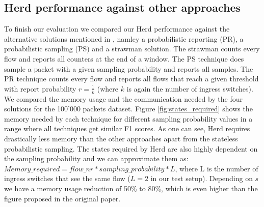 \documentclass[11pt,oneside,a4paper]{article}
\begin{document}
\subsection{Herd performance against other approaches} \label{other_approaches_evaluation}

To finish our evaluation we compared our Herd performance against the alternative solutions mentioned in \cite{anon2019herd}, namley a probabilistic reporting (PR), a probabilistic sampling (PS) and a strawman solution. The strawman counts every flow and reports all counters at the end of a window. The PS technique does sample a packet with a given sampling probability and reports all samples. The PR technique counts every flow and reports all flows that reach a given threshold with report probability $r = \frac{1}{k}$ (where $k$ is again the number of ingress switches).
\newline We compared the memory usage and the communication needed by the four solutions for the 100'000 packets dataset. Figure \ref{fig:states_required} shows the memory needed by each technique for different sampling probability values in a range where all techniques get similar F1 scores. As one can see, Herd requires drastically less memory than the other approaches apart from the stateless probabilistic sampling. The states required by Herd are also highly dependent on the sampling probability and we can approximate them as: $Memory\_required = flow\_nr * sampling\_probability * L$, where L is the number of ingress switches that see the same flow ($L = 2$ in our test setup). Depending on $s$ we have a memory usage reduction of 50\% to 80\%, which is even higher than the figure proposed in the original paper. \newline
\end{document}
